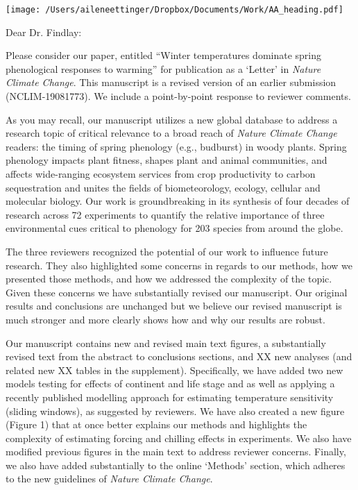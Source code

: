 \documentclass[11.5pt,a4paper]{letter}
\begin{document}
\begin{letter}{}
\texttt{[image: /Users/aileneettinger/Dropbox/Documents/Work/AA\_heading.pdf]}

\opening{Dear Dr. Findlay:}
Please consider our paper, entitled ``Winter temperatures dominate spring phenological responses to warming'' for publication as a `Letter' in \emph{Nature Climate Change}. This manuscript is a revised version of an earlier submission (NCLIM-19081773). We include a point-by-point response to reviewer comments. 

\par As you may recall, our manuscript utilizes a new global database to address a research topic of critical relevance to a broad reach of \emph{Nature Climate Change} readers:  the timing of spring phenology (e.g., budburst) in woody plants. Spring phenology impacts plant fitness, shapes plant and animal communities, and affects wide-ranging ecosystem services from crop productivity to carbon sequestration and unites the fields of biometeorology, ecology, cellular and molecular biology. Our work is groundbreaking in its synthesis of four decades of research across 72 experiments to quantify the relative importance of three environmental cues critical to phenology for 203 species from around the globe. 

\par The three reviewers recognized the potential of our work to influence future research. They also highlighted some concerns in regards to our methods, how we presented those methods, and how we addressed the complexity of the topic. Given these concerns we have substantially revised our manuscript. Our original results and conclusions are unchanged but we believe our revised manuscript is much stronger and more clearly shows how and why our results are robust.

\par Our manuscript contains new and revised main text figures, a substantially revised text from the abstract to conclusions sections, and XX new analyses (and related new XX tables in the supplement). Specifically, we have added two new models testing for effects of continent and life stage and as well as applying a recently published modelling approach for estimating temperature sensitivity (sliding windows), as suggested by reviewers. We have also created a new figure (Figure 1) that at once better explains our methods and highlights the complexity of estimating forcing and chilling effects in experiments. We also have modified previous figures in the main text to address reviewer concerns. Finally, we also have added substantially to the online `Methods' section, which adheres to the new guidelines of \emph{Nature Climate Change}. %


\end{letter}
\end{document}
